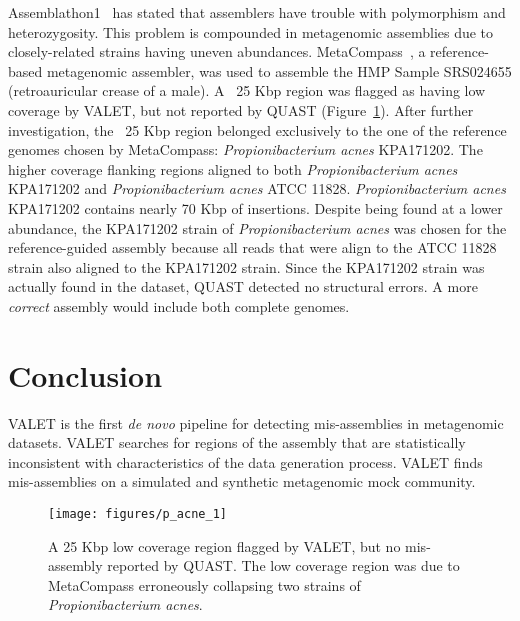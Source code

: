 Assemblathon1~\cite{earl2011assemblathon} has stated that assemblers have trouble with polymorphism and heterozygosity.
This problem is compounded in metagenomic assemblies due to closely-related strains having uneven abundances.
MetaCompass~\cite{metacompass}, a reference-based metagenomic assembler, was used to assemble the HMP Sample SRS024655 (retroauricular crease of a male).
A ~25 Kbp region was flagged as having low coverage by VALET, but not reported by QUAST (Figure~\ref{fig:p_acnes}).
After further investigation, the ~25 Kbp region belonged exclusively to the one of the reference genomes chosen by MetaCompass: \emph{Propionibacterium acnes} KPA171202.
The higher coverage flanking regions aligned to both \emph{Propionibacterium acnes} KPA171202 and \emph{Propionibacterium acnes} ATCC 11828.
\emph{Propionibacterium acnes} KPA171202 contains nearly 70 Kbp of insertions.
Despite being found at a lower abundance, the KPA171202 strain of \emph{Propionibacterium acnes} was chosen for the reference-guided assembly because all reads that were align to the ATCC 11828 strain also aligned to the KPA171202 strain.
Since the KPA171202 strain was actually found in the dataset, QUAST detected no structural errors.
A more \emph{correct} assembly would include both complete genomes.


\section{Conclusion}

VALET is the first \emph{de novo} pipeline for detecting mis-assemblies in metagenomic datasets.
VALET searches for regions of the assembly that are statistically inconsistent with characteristics of the data generation process.
VALET finds mis-assemblies on a simulated and synthetic metagenomic mock community.

\begin{landscape}
\renewcommand{\baselinestretch}{1}
\small\normalsize
\begin{figure}[tb!]
\begin{center}
\texttt{[image: figures/p\_acne\_1]}
\end{center}
\renewcommand{\baselinestretch}{1}
\small\normalsize
\begin{quote}
\caption[Examining a 25 Kbp region flagged by VALET]{A 25 Kbp low coverage region flagged by VALET, but no mis-assembly reported by QUAST. The low coverage region was due to MetaCompass erroneously collapsing two strains of \emph{Propionibacterium acnes}.}
\label{fig:p_acnes}
\end{quote}
\end{figure}
\renewcommand{\baselinestretch}{2}
\small\normalsize
\end{landscape}
